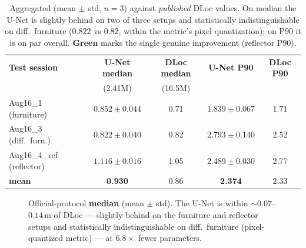 \documentclass[11pt,a4paper]{article}
\newcommand{\best}[1]{\textcolor{ours}{\textbf{#1}}}
\begin{document}
\begin{table}[H]
\centering
\caption{Aggregated (mean $\pm$ std, $n=3$) against \emph{published} DLoc values. On median the
U-Net is slightly behind on two of three setups and statistically indistinguishable on
diff.\ furniture ($0.822$ vs $0.82$, within the metric's pixel quantization); on P90 it is on par
overall. \best{Green} marks the single genuine improvement (reflector P90).}
\label{tab:cross_new_agg}
\begin{tabular}{@{}lcccc@{}}
\toprule
\textbf{Test session} & \textbf{U-Net median} & \textbf{DLoc median} & \textbf{U-Net P90} & \textbf{DLoc P90} \\
 & \footnotesize(2.41M) & \footnotesize(16.5M) & & \\
\midrule
Aug16\_1 (furniture)      & $0.852\pm0.044$ & 0.71 & $1.839\pm0.067$ & 1.71 \\
Aug16\_3 (diff.\ furn.)   & $0.822\pm0.040$ & 0.82 & $2.793\pm0.140$ & 2.52 \\
Aug16\_4\_ref (reflector) & $1.116\pm0.016$ & 1.05 & \best{$2.489\pm0.030$} & 2.77 \\
\midrule
\textbf{mean} & \textbf{0.930} & 0.86 & \textbf{2.374} & 2.33 \\
\bottomrule
\end{tabular}
\end{table}

\begin{figure}[H]
\centering
{}
\caption{Official-protocol \textbf{median} (mean $\pm$ std). The U-Net is within
${\sim}0.07$--$0.14$\,m of DLoc --- slightly behind on the furniture and reflector setups and
statistically indistinguishable on diff.\ furniture (pixel-quantized metric) --- at $6.8\times$
fewer parameters.}
\end{figure}
\end{document}
